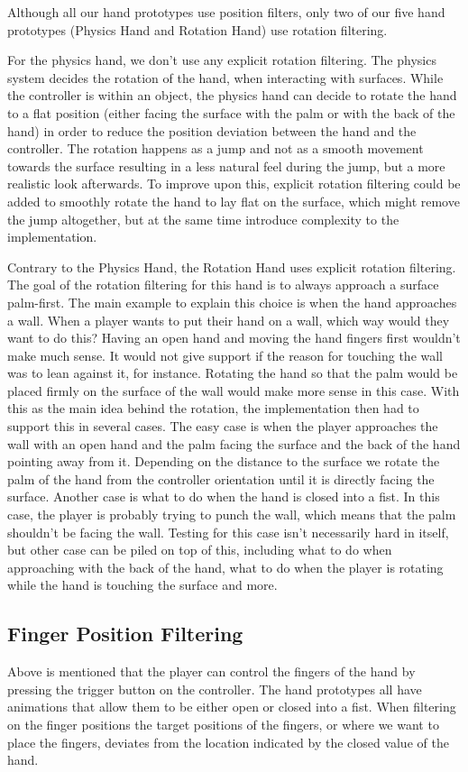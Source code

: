 Although all our hand prototypes use position filters, only two of our five hand prototypes (Physics Hand and Rotation Hand) use rotation filtering.

For the physics hand, we don't use any explicit rotation filtering. The physics system decides the rotation of the hand, when interacting with surfaces. While the controller is within an object, the physics hand can decide to rotate the hand to a flat position (either facing the surface with the palm or with the back of the hand) in order to reduce the position deviation between the hand and the controller. The rotation happens as a jump and not as a smooth movement towards the surface resulting in a less natural feel during the jump, but a more realistic look afterwards. To improve upon this, explicit rotation filtering could be added to smoothly rotate the hand to lay flat on the surface, which might remove the jump altogether, but at the same time introduce complexity to the implementation.

Contrary to the Physics Hand, the Rotation Hand uses explicit rotation filtering. The goal of the rotation filtering for this hand is to always approach a surface palm-first. The main example to explain this choice is when the hand approaches a wall. When a player wants to put their hand on a wall, which way would they want to do this? Having an open hand and moving the hand fingers first wouldn't make much sense. It would not give support if the reason for touching the wall was to lean against it, for instance. Rotating the hand so that the palm would be placed firmly on the surface of the wall would make more sense in this case. With this as the main idea behind the rotation, the implementation then had to support this in several cases. The easy case is when the player approaches the wall with an open hand and the palm facing the surface and the back of the hand pointing away from it. Depending on the distance to the surface we rotate the palm of the hand from the controller orientation until it is directly facing the surface. Another case is what to do when the hand is closed into a fist. In this case, the player is probably trying to punch the wall, which means that the palm shouldn't be facing the wall. Testing for this case isn't necessarily hard in itself, but other case can be piled on top of this, including what to do when approaching with the back of the hand, what to do when the player is rotating while the hand is touching the surface and more.

\subsection{Finger Position Filtering}
\label{subsec:categoryFingerFiltering}
Above is mentioned that the player can control the fingers of the hand by pressing the trigger button on the controller. The hand prototypes all have animations that allow them to be either open or closed into a fist. When filtering on the finger positions the target positions of the fingers, or where we want to place the fingers, deviates from the location indicated by the closed value of the hand.

